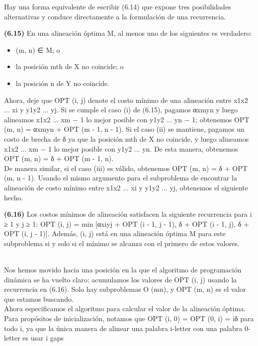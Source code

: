 \documentclass[a4paper]{article}
\begin{document}
Hay una forma equivalente de escribir (6.14) que expone tres posibilidades alternativas y conduce directamente a la formulación de una recurrencia.\\

\colorbox{mygray}{\parbox{15cm}{
\textbf{(6.15)} En una alineación óptima M, al menos uno de los siguientes es verdadero:
\begin{itemize}
    \item (m, n) ∈ M; o
    \item la posición mth de X no coincide; o
    \item la posición n de Y no coincide.
\end{itemize}}}

Ahora, deje que OPT (i, j) denote el costo mínimo de una alineación entre x1x2 ... xi y y1y2 ... yj. Si se cumple el caso (i) de (6.15), pagamos αxmyn y luego alineamos x1x2 ... xm − 1 lo mejor posible con y1y2 ... yn − 1; obtenemos OPT (m, n) = αxmyn + OPT (m - 1, n - 1). Si el caso (ii) se mantiene, pagamos un costo de brecha de δ ya que la posición mth de X no coincide, y luego alineamos x1x2 ... xm − 1 lo mejor posible con y1y2 ... yn. De esta manera, obtenemos OPT (m, n) = δ + OPT (m - 1, n).\\

De manera similar, si el caso (iii) es válido, obtenemos OPT (m, n) = δ + OPT (m, n - 1). Usando el mismo argumento para el subproblema de encontrar la alineación de costo mínimo entre x1x2 ... xi y y1y2 ... yj, obtenemos el siguiente hecho.\\

\colorbox{mygray}{\parbox{15cm}{
\textbf{(6.16)} Los costos mínimos de alineación satisfacen la siguiente recurrencia para i ≥ 1 y j ≥ 1:
OPT (i, j) = min [αxiyj + OPT (i - 1, j - 1), δ + OPT (i - 1, j), δ + OPT (i, j - 1)]. Además, (i, j) está en una alineación óptima M para este subproblema si y solo si el mínimo se alcanza con el primero de estos valores.}}\\

Nos hemos movido hacia una posición en la que el algoritmo de programación dinámica se ha vuelto claro: acumulamos los valores de OPT (i, j) usando la recurrencia en (6.16). Solo hay subproblemas O (mn), y OPT (m, n) es el valor que estamos buscando.\\

Ahora especificamos el algoritmo para calcular el valor de la alineación óptima. Para propósitos de inicialización, notamos que OPT (i, 0) = OPT (0, i) = iδ para todo i, ya que la única manera de alinear una palabra i-letter con una palabra 0-letter es usar i gaps\\
\end{document}

